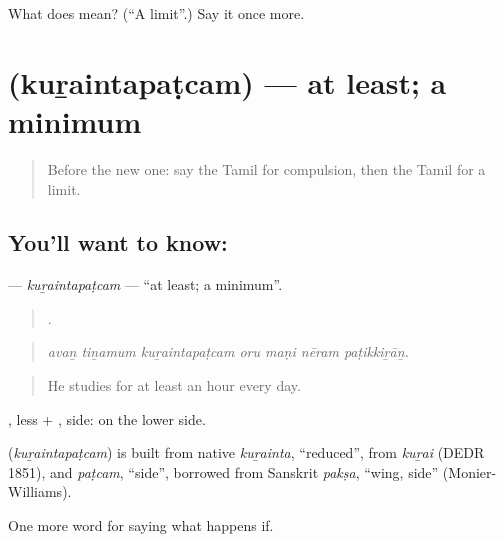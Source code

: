 \begin{tcolorbox}[breakable,colback=teal!4,colframe=teal!35!black,title={Before you move on}]
What does  mean? (\textquotedblleft{}A limit\textquotedblright{}.) Say it once more.
\end{tcolorbox}
\section[\texorpdfstring{\ta{குறைந்தபட்சம்} (kuṟaintapaṭcam)}{குறைந்தபட்சம் (kuṟaintapaṭcam)}]{ (kuṟaintapaṭcam) — at least; a minimum}

\label{lesson:TA-C384-kuraintapatcam}



\begin{quote}
Before the new one: say the Tamil for compulsion, then the Tamil for a limit.
\end{quote}

\subsection*{You'll want to know: }
\textbf{} — \emph{kuṟaintapaṭcam} — \textquotedblleft{}at least; a minimum\textquotedblright{}.

\begin{quote}
      .
\end{quote}

\begin{quote}
\emph{avaṉ tiṉamum kuṟaintapaṭcam oru maṇi nēram paṭikkiṟāṉ.}
\end{quote}

\begin{quote}
He studies for at least an hour every day.
\end{quote}

, less + , side: on the lower side.

\begin{cousinweb}
\textbf{} (\emph{kuṟaintapaṭcam}) is built from native \emph{kuṟainta}, \textquotedblleft{}reduced\textquotedblright{}, from \emph{kuṟai} (DEDR 1851), and \emph{paṭcam}, \textquotedblleft{}side\textquotedblright{}, borrowed from Sanskrit \emph{pakṣa}, \textquotedblleft{}wing, side\textquotedblright{} (Monier-Williams).
\end{cousinweb}

\begin{grammarlens}[title={What you've built}]
One more word for saying what happens if.
\end{grammarlens}

